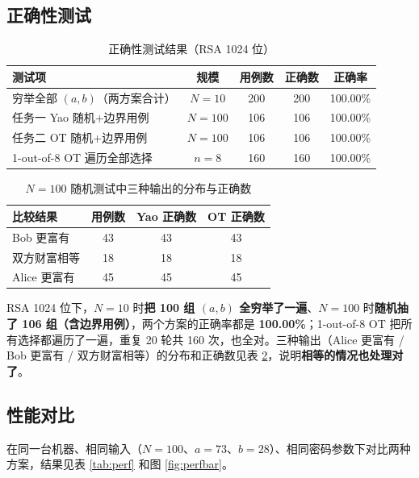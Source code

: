 \documentclass{SYSUReport}
\begin{document}
\subsection{正确性测试}

\begin{table}[h]
\centering
\begin{tabular}{lcccc}
\toprule
测试项 & 规模 & 用例数 & 正确数 & 正确率 \\
\midrule
穷举全部 $(a,b)$（两方案合计） & $N=10$ & 200 & 200 & 100.00\% \\
任务一 Yao 随机+边界用例 & $N=100$ & 106 & 106 & 100.00\% \\
任务二 OT 随机+边界用例 & $N=100$ & 106 & 106 & 100.00\% \\
1-out-of-8 OT 遍历全部选择 & $n=8$ & 160 & 160 & 100.00\% \\
\bottomrule
\end{tabular}
\caption{正确性测试结果（RSA 1024 位）}
\label{tab:corr}
\end{table}

\begin{table}[h]
\centering
\begin{tabular}{lccc}
\toprule
比较结果 & 用例数 & Yao 正确数 & OT 正确数 \\
\midrule
Bob 更富有 & 43 & 43 & 43 \\
双方财富相等 & 18 & 18 & 18 \\
Alice 更富有 & 45 & 45 & 45 \\
\bottomrule
\end{tabular}
\caption{$N=100$ 随机测试中三种输出的分布与正确数}
\label{tab:outcome}
\end{table}

RSA 1024 位下，$N=10$ 时\textbf{把 100 组 $(a,b)$ 全穷举了一遍}、$N=100$ 时\textbf{随机抽了 106 组（含边界用例）}，两个方案的正确率都是 \textbf{100.00\%}；1-out-of-8 OT 把所有选择都遍历了一遍，重复 20 轮共 160 次，也全对。三种输出（Alice 更富有 / Bob 更富有 / 双方财富相等）的分布和正确数见表 \ref{tab:outcome}，说明\textbf{相等的情况也处理对了}。

\subsection{性能对比}

在同一台机器、相同输入（$N=100$、$a=73$、$b=28$）、相同密码参数下对比两种方案，结果见表 \ref{tab:perf} 和图 \ref{fig:perfbar}。
\end{document}
